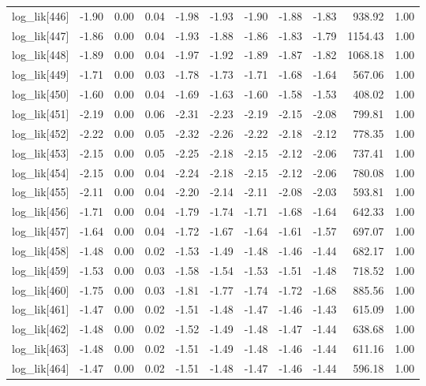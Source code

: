 \begin{table}[ht]
\begin{tabular}{rrrrrrrrrrr}
  log\_lik[446] & -1.90 & 0.00 & 0.04 & -1.98 & -1.93 & -1.90 & -1.88 & -1.83 & 938.92 & 1.00 \\ 
  log\_lik[447] & -1.86 & 0.00 & 0.04 & -1.93 & -1.88 & -1.86 & -1.83 & -1.79 & 1154.43 & 1.00 \\ 
  log\_lik[448] & -1.89 & 0.00 & 0.04 & -1.97 & -1.92 & -1.89 & -1.87 & -1.82 & 1068.18 & 1.00 \\ 
  log\_lik[449] & -1.71 & 0.00 & 0.03 & -1.78 & -1.73 & -1.71 & -1.68 & -1.64 & 567.06 & 1.00 \\ 
  log\_lik[450] & -1.60 & 0.00 & 0.04 & -1.69 & -1.63 & -1.60 & -1.58 & -1.53 & 408.02 & 1.00 \\ 
  log\_lik[451] & -2.19 & 0.00 & 0.06 & -2.31 & -2.23 & -2.19 & -2.15 & -2.08 & 799.81 & 1.00 \\ 
  log\_lik[452] & -2.22 & 0.00 & 0.05 & -2.32 & -2.26 & -2.22 & -2.18 & -2.12 & 778.35 & 1.00 \\ 
  log\_lik[453] & -2.15 & 0.00 & 0.05 & -2.25 & -2.18 & -2.15 & -2.12 & -2.06 & 737.41 & 1.00 \\ 
  log\_lik[454] & -2.15 & 0.00 & 0.04 & -2.24 & -2.18 & -2.15 & -2.12 & -2.06 & 780.08 & 1.00 \\ 
  log\_lik[455] & -2.11 & 0.00 & 0.04 & -2.20 & -2.14 & -2.11 & -2.08 & -2.03 & 593.81 & 1.00 \\ 
  log\_lik[456] & -1.71 & 0.00 & 0.04 & -1.79 & -1.74 & -1.71 & -1.68 & -1.64 & 642.33 & 1.00 \\ 
  log\_lik[457] & -1.64 & 0.00 & 0.04 & -1.72 & -1.67 & -1.64 & -1.61 & -1.57 & 697.07 & 1.00 \\ 
  log\_lik[458] & -1.48 & 0.00 & 0.02 & -1.53 & -1.49 & -1.48 & -1.46 & -1.44 & 682.17 & 1.00 \\ 
  log\_lik[459] & -1.53 & 0.00 & 0.03 & -1.58 & -1.54 & -1.53 & -1.51 & -1.48 & 718.52 & 1.00 \\ 
  log\_lik[460] & -1.75 & 0.00 & 0.03 & -1.81 & -1.77 & -1.74 & -1.72 & -1.68 & 885.56 & 1.00 \\ 
  log\_lik[461] & -1.47 & 0.00 & 0.02 & -1.51 & -1.48 & -1.47 & -1.46 & -1.43 & 615.09 & 1.00 \\ 
  log\_lik[462] & -1.48 & 0.00 & 0.02 & -1.52 & -1.49 & -1.48 & -1.47 & -1.44 & 638.68 & 1.00 \\ 
  log\_lik[463] & -1.48 & 0.00 & 0.02 & -1.51 & -1.49 & -1.48 & -1.46 & -1.44 & 611.16 & 1.00 \\ 
  log\_lik[464] & -1.47 & 0.00 & 0.02 & -1.51 & -1.48 & -1.47 & -1.46 & -1.44 & 596.18 & 1.00 \\ 

\end{tabular}
\end{table}
